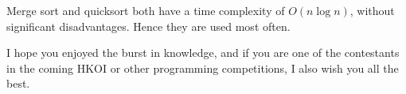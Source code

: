 Merge sort and quicksort both have a time complexity of $O(n\log n)$, without significant disadvantages. Hence they are used most often. 
\vspace{6mm}

I hope you enjoyed the burst in knowledge, and if you are one of the contestants in the coming HKOI or other programming competitions, I also wish you all the best.